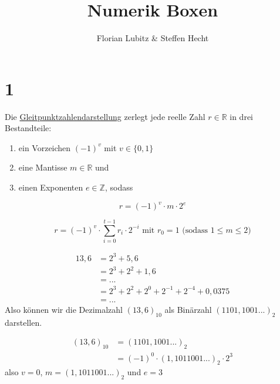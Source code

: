 \documentclass[13pt]{scrreprt}
\title{Numerik Boxen}
\author{Florian Lubitz \& Steffen Hecht}
\begin{document}
\maketitle

\chapter{1}

\begin{dbox}
\end{dbox}

\begin{tbox}
	Die \underline{Gleitpunktzahlendarstellung} zerlegt jede reelle Zahl $r \in \mathbb{R}$ in drei Bestandteile:\\
	\begin{enumerate}[label=\Roman*)]
		\item ein Vorzeichen $ (-1)^v$ mit $v \in \{0, 1\}$
		\item eine Mantisse $m \in \mathbb{R}$ und
		\item einen Exponenten $e \in \mathbb{Z}$, sodass
	\end{enumerate}
	\begin{equation}
	r = (-1)^v \cdot m \cdot 2^e
	\end{equation}
\end{tbox}

\begin{tbox}
	\begin{equation}
	r = (-1)^v \cdot \sum_{i = 0}^{t - 1} r_i \cdot 2^{-i} \text{ mit } r_0 = 1 \text{ (sodass } 1 \le m \le 2\text{)}
	\end{equation}
\end{tbox}

\begin{tbox}
	\begin{align*}
	13,6 &= 2^3 + 5,6\\
	&= 2^3 + 2^2 + 1,6\\
	&= ...\\
	&= 2^3 + 2^2 + 2^0 + 2^{-1} + 2^{-4} + 0,0375\\
	&= ...
	\end{align*}
	Also können wir die Dezimalzahl $(13,6)_{10}$ als Binärzahl $(1101,1001...)_2$ darstellen.
\end{tbox}

\begin{tbox}
	\begin{align*}
	(13,6)_{10} &= (1101,1001...)_2\\
	&= (-1)^0 \cdot (1,1011001...)_2 \cdot 2^3
	\end{align*}
	also $v = 0$, $m = (1,1011001...)_2$ und $e = 3$
\end{tbox}
\end{document}
